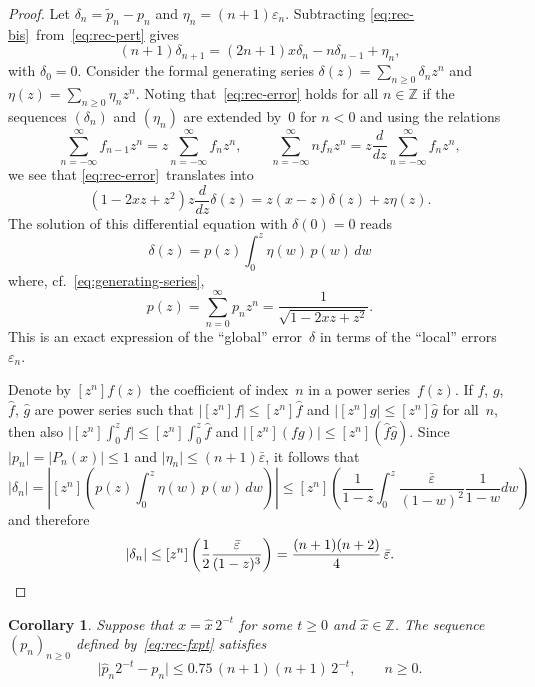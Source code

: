 \documentclass[11pt,a4paper]{article}
\newtheorem{corollary}[theorem]{Corollary}
\newcommand{\abs}[1]{\mathopen| #1 \mathclose|}
\newcommand{\ddz}{\frac{d}{dz}}
\begin{document}
\begin{proof}
Let
$\delta_n = \tilde{p}_n - p_n$
and
$\eta_n = (n + 1) \varepsilon_n$.
Subtracting \eqref{eq:rec-bis} from \eqref{eq:rec-pert} gives
\begin{equation} \label{eq:rec-error}
  (n + 1) \delta_{n + 1}
  = (2 n + 1) x \delta_n - n \delta_{n - 1} + \eta_n,
\end{equation}
with $\delta_0 = 0$.
Consider the formal generating series
$\delta(z) = \sum_{n \geq 0} \delta_n z^n$
and
$\eta(z) = \sum_{n \geq 0} \eta_n z^n$.
Noting that \eqref{eq:rec-error} holds for all $n \in \mathbb{Z}$ if
the sequences $(\delta_n)$ and $(\eta_n)$ are extended by~$0$ for
$n < 0$
and using the relations
\[
  \sum_{n=-\infty}^{\infty} f_{n - 1} z^n
  = z \sum_{n=-\infty}^{\infty} f_n z^n,
  \qquad
  \sum_{n=-\infty}^{\infty} n f_{n} z^n
  = z \ddz \sum_{n=-\infty}^{\infty} f_n z^n,
\]
we see that \eqref{eq:rec-error} translates into
\[ (1 - 2 xz + z^2) z \ddz \delta (z)
   = z (x - z) \delta (z) + z \eta (z). \]
The solution of this differential equation with $\delta (0) = 0$ reads
\[ \delta(z) = p(z)  \int_0^z \eta(w) \, p(w) \, dw \]
where, cf. \eqref{eq:generating-series},
\[ p(z) = \sum_{n=0}^{\infty} p_n z^n
        = \frac{1}{\sqrt{1 - 2 xz + z^2}}. \]
This is an exact expression of the ``global'' error $\delta$ in terms
of the ``local'' errors~$\varepsilon_n$.

Denote by $[z^n] f(z)$ the coefficient of index $n$ in a power
series $f(z)$.
If $f$, $g$, $\hat f$, $\hat g$ are power series such that
$\abs{[z^n] f} \leq [z^n] \hat f$ and
$\abs{[z^n] g} \leq [z^n] \hat g$
for all $n$, then also
$\abs{[z^n] \int_0^z f} \leq [z^n] \int_0^z \hat f$ and
$\abs{[z^n] (fg)} \leq [z^n] (\hat f \hat g)$.
Since $\abs{p_n} = \abs{P_n(x)} \leq 1$
and $\abs{\eta_n} \leq (n+1) \bar \varepsilon$,
it follows that
\[
  \abs{\delta_n}
  = \left| [z^n] \left( p(z)  \int_0^z \eta(w) \, p(w) \, dw \right) \right|
  \leq [z^n] \left(
    \frac{1}{1-z}
    \int_0^z \frac{\bar \varepsilon}{(1 - w)^2} \frac{1}{1-w} dw \right)
\]
and therefore
\[
  \abs{\delta_n}
  \leq [z^n] \left( \frac12 \frac{\bar \varepsilon}{(1-z)^3} \right)
  = \frac{(n+1)(n+2)}{4} \, \bar \varepsilon. \qedhere
\]
\end{proof}

\begin{corollary}
Suppose that $x = \hat x \, 2^{-t}$ for some $t \geq 0$ and
$\hat x \in \mathbb Z$.
The sequence $(p_n)_{n \geq 0}$ defined by \eqref{eq:rec-fxpt}
satisfies
\[
  \abs{ \hat p_n 2^{-t} - p_n }
  \leq 0.75 \, (n+1) (n+1) \, 2^{-t},
  \qquad
  n \geq 0.
\]
\end{corollary}
\end{document}
